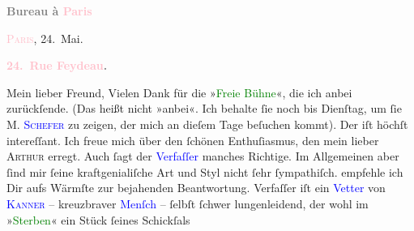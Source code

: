            \pstart
           \begin{otherlanguage}{french}\textcolor{gray}{\textbf{\textbf{Bureau à \textcolor{pink}{Paris}{}\ledrightnote{\textcolor{pink}{Paris}}}}}\end{otherlanguage}\hfill \textsc{\textcolor{pink}{Paris}{}\ledrightnote{\textcolor{pink}{Paris}}}, 24. Mai.\pend
           \pstart
           \begin{otherlanguage}{french}\textcolor{gray}{\textbf{\textbf{\textcolor{pink}{24. Rue Feydeau}{}\ledrightnote{\textcolor{pink}{rue Feydeau}}.}}}\end{otherlanguage}\pend
           \pstart\center{}Mein lieber Freund,\pend\pstart
           Vielen Dank für die »\textcolor{green}{Freie
                  Bühne}{}«, die ich anbei zurückſende. (Das heißt nicht »anbei«. Ich behalte ſie
               noch bis Dienſtag, um ſie \textsc{M. \textcolor{blue}{Schefer}{}\ledrightnote{\textcolor{blue}{Christian Schefer}}} zu zeigen, der mich an dieſem Tage beſuchen
               kommt). Der \label{K_L02775-88v}\label{K_L02775-88h} iſt höchſt
               intereſſant. Ich freue mich über den ſchönen Enthuſiasmus, den mein lieber \textsc{Arthur} erregt. Auch ſagt der {\pb}\textcolor{blue}{Verfaſſer}{} manches Richtige.
               Im Allgemeinen aber ſind \strikeout{\textcolor{gray}{E}} mir ſeine kraftgenialiſche Art und Styl nicht ſehr ſympathiſch.\pend
           \pstart
           \label{K_L02775-24v}\label{K_L02775-24h} empfehle ich  Dir aufs Wärmſte zur bejahenden Beantwortung.
               Verfaſſer iſt ein \textcolor{blue}{Vetter}{} von
                  \textsc{\textcolor{blue}{Kanner}{}\ledrightnote{\textcolor{blue}{Heinrich Kanner}}} – kreuzbraver \textcolor{blue}{Menſch}{} –
               ſelbſt ſchwer lungenleidend, der wohl im »\textcolor{green}{Sterben}{}\ledrightnote{\textcolor{green}{Sterben. Novelle}}« ein Stück {\pb}ſeines Schickſals
